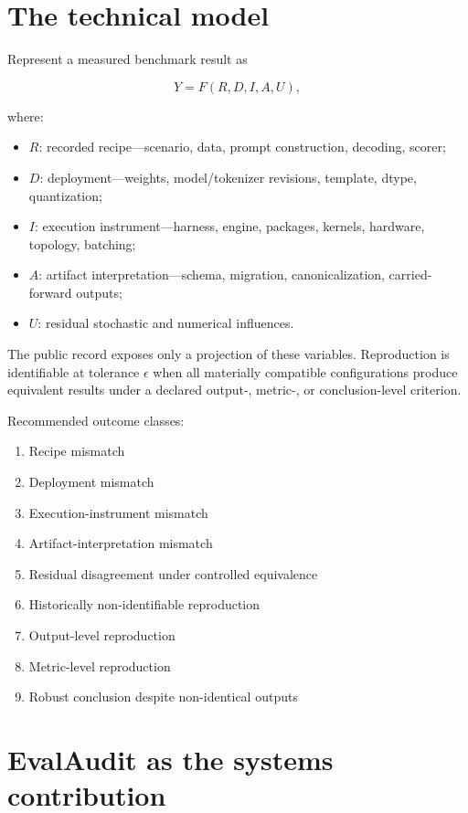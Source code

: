 \documentclass[11pt]{article}
\begin{document}
\section{The technical model}

Represent a measured benchmark result as

\[
Y = F(R,D,I,A,U),
\]

where:

\begin{itemize}
  \item $R$: recorded recipe---scenario, data, prompt construction, decoding, scorer;
  \item $D$: deployment---weights, model/tokenizer revisions, template, dtype, quantization;
  \item $I$: execution instrument---harness, engine, packages, kernels, hardware, topology, batching;
  \item $A$: artifact interpretation---schema, migration, canonicalization, carried-forward outputs;
  \item $U$: residual stochastic and numerical influences.
\end{itemize}

The public record exposes only a projection of these variables. Reproduction is identifiable at tolerance $\epsilon$ when all materially compatible configurations produce equivalent results under a declared output-, metric-, or conclusion-level criterion.

Recommended outcome classes:

\begin{enumerate}
  \item Recipe mismatch
  \item Deployment mismatch
  \item Execution-instrument mismatch
  \item Artifact-interpretation mismatch
  \item Residual disagreement under controlled equivalence
  \item Historically non-identifiable reproduction
  \item Output-level reproduction
  \item Metric-level reproduction
  \item Robust conclusion despite non-identical outputs
\end{enumerate}

\section{EvalAudit as the systems contribution}
\end{document}

